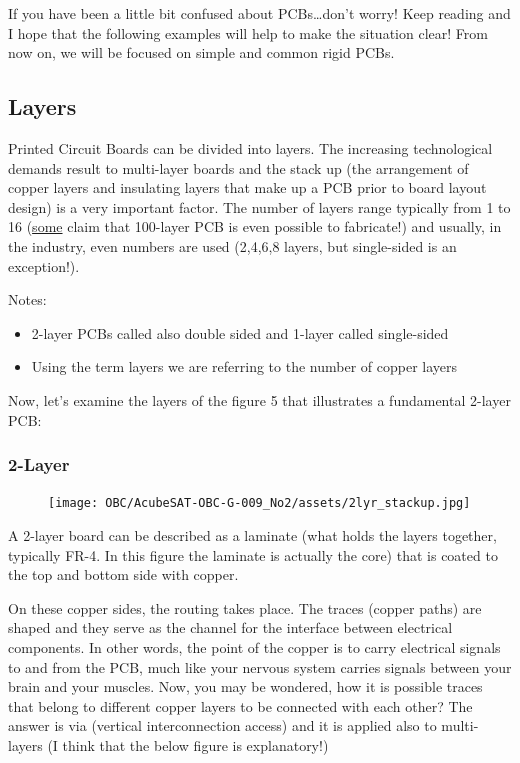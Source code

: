 \documentclass[final]{cubedoc}
\begin{document}
	If you have been a little bit confused about PCBs…don’t worry! Keep reading and I hope that the following examples will help to make  the situation clear! From now on, we will be focused on simple and common rigid PCBs.
	
	\subsection{Layers}
	
	Printed Circuit Boards can be divided into layers. The increasing technological demands result to multi-layer boards and the stack up (the arrangement of copper layers and insulating layers that make up a PCB prior to board layout design)  is a very important factor. The number of layers range typically from 1 to 16 (\href{https://en.wikipedia.org/wiki/List_of_integrated_circuit_packaging_types}{some} claim that 100-layer PCB is even possible to fabricate!) and usually, in the industry, even numbers are used (2,4,6,8 layers, but single-sided is an exception!). 
	
	Notes:
	\begin{itemize}
		\item 2-layer PCBs called also double sided and 1-layer called single-sided
		\item Using the term layers we are referring to the number of copper layers
	\end{itemize}
	
	Now, let’s examine the layers of the figure 5 that illustrates a fundamental 2-layer PCB: 	
	
	\subsubsection{2-Layer}
	
	\begin{figure}[h!]
		\centering
		\texttt{[image: OBC/AcubeSAT-OBC-G-009\_No2/assets/2lyr\_stackup.jpg]}
		\caption{}
		\label{fig:my_label}
	\end{figure}
	
	A 2-layer board can be described as a laminate (what holds the layers together, typically FR-4. In this figure the laminate is actually the core) that is coated to the top and bottom side with copper. 
	
	On these copper sides, the routing takes place. The traces (copper paths) are shaped and they serve as the channel for the interface between electrical components. In other words, the point of the copper is to carry electrical signals to and from the PCB, much like your nervous system carries signals between your brain and your muscles. Now, you may be wondered, how it is possible traces that belong to different copper layers to be connected with each other? The answer is via (vertical interconnection access) and it is applied also to multi-layers (I think that the below figure is  explanatory!) 
	
\end{document}
